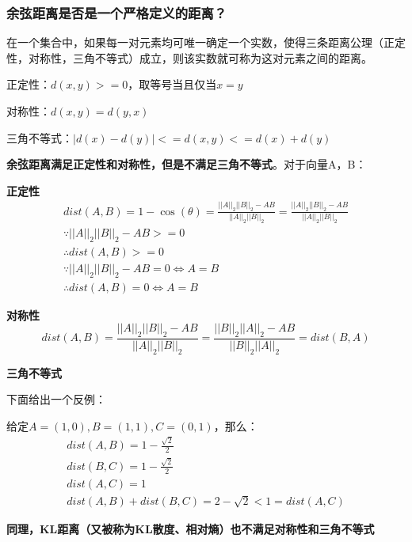 \documentclass[12pt]{article}
\begin{document}
\subsubsection{余弦距离是否是一个严格定义的距离？}
在一个集合中，如果每一对元素均可唯一确定一个实数，使得三条距离公理（正定性，对称性，三角不等式）成立，则该实数就可称为这对元素之间的距离。

正定性：$d(x,y)>=0$，取等号当且仅当$x=y$

对称性：$d(x,y)=d(y,x)$

三角不等式：$|d(x) - d(y)| <= d(x,y) <= d(x) + d(y)$


\textbf{余弦距离满足正定性和对称性，但是不满足三角不等式}。对于向量A，B：

\textbf{正定性}
\begin{gather*}
    dist(A,B) = 1 - \cos(\theta) = \frac{||A||_2||B||_2 - AB}{||A||_2||B||_2} = \frac{||A||_2||B||_2 - AB}{||A||_2||B||_2} \\
    \because ||A||_2||B||_2 - AB >= 0 \\
    \therefore dist(A,B) >= 0 \\
    \because ||A||_2||B||_2 - AB = 0  \Leftrightarrow A = B \\
    \therefore dist(A,B) = 0 \Leftrightarrow A = B
\end{gather*}

\textbf{对称性}
$$
dist(A,B) = \frac{||A||_2||B||_2 - AB}{||A||_2||B||_2} = \frac{||B||_2||A||_2 - AB}{||B||_2||A||_2} = dist(B,A)
$$

\textbf{三角不等式}

下面给出一个反例：

给定$A=(1,0), B=(1,1), C=(0,1)$，那么：
\begin{gather*}
dist(A,B) = 1 - \frac{\sqrt{2}}{2}   \\
dist(B,C) = 1 - \frac{\sqrt{2}}{2} \\
dist(A,C) = 1 \\
dist(A,B) + dist(B,C) = 2 - \sqrt{2} < 1 = dist(A,C)
\end{gather*}

\textbf{同理，KL距离（又被称为KL散度、相对熵）也不满足对称性和三角不等式}



\end{document}
